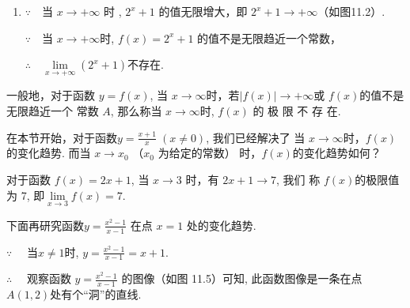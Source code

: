 \begin{solution}
\begin{enumerate}[(1)]
$\because\quad f(x)=\frac{-x}{x+2}=-1+\frac{2}{x+2}$，
当 $x\to \infty$ 时 , $\frac 2{x+ 2}\to 0$

$\therefore\quad - 1+ \frac 2{x+ 2}\rightarrow - 1$

$\therefore\quad \lim\limits_{x\to \infty }\frac {- x}{x+ 2}= - 1$

\begin{figure}[htp]
    \centering
{}
    \caption{}
\end{figure}


\item $\because\quad $当 $x\to + \infty$ 时 , $2^{x}+ 1$ 的值无限增大，即 $2^x+1\to+\infty$（如图11.2）.

$\because\quad $当 $x\to+\infty$时, $f(x)=2^x+1$ 的值不是无限趋近一个常数，

$\therefore\quad \lim\limits_{x\to + \infty }\left ( 2^x+ 1\right )$不存在. 
\end{enumerate}
\end{solution}


一般地，对于函数 $y=f(x)$, 当 $x\to\infty$时，若$|f(x)|\to+\infty$或 $f(x)$的值不是无限趋近一个
常数 $A$, 那么称当 $x\to\infty$时, $f( x)$ 的 极 限 不 存 在.

在本节开始，对于函数$y=\frac{x+1}{x}\; (x\neq0)$, 我们已经解决了
当 $x\to\infty$时，$f(x)$的变化趋势. 而当 $x\to x_0$ （$x_{0}$ 为给定的常数）
时，$f(x)$的变化趋势如何？

对于函数 $f(x)=2x+1$, 当 $x\to3$ 时，有 $2x+1\to7$, 我们
称 $f(x)$的极限值为 7, 即$\lim\limits_{x\to3}f(x)=7$.

下面再研究函数$y=\frac{x^{2}-1}{x-1}$ 在点 $x=1$ 处的变化趋势.

$\because\quad$ 当$x\neq1$时, $y=\frac{x^{2}-1}{x-1}=x+1$.

$\therefore\quad$ 观察函数 $y=\frac{x^{2}-1}{x-1}$ 的图像（如图 11.5）可知, 此函数图像是一条在点 $A(1,2)$处有个“洞”的直线.

